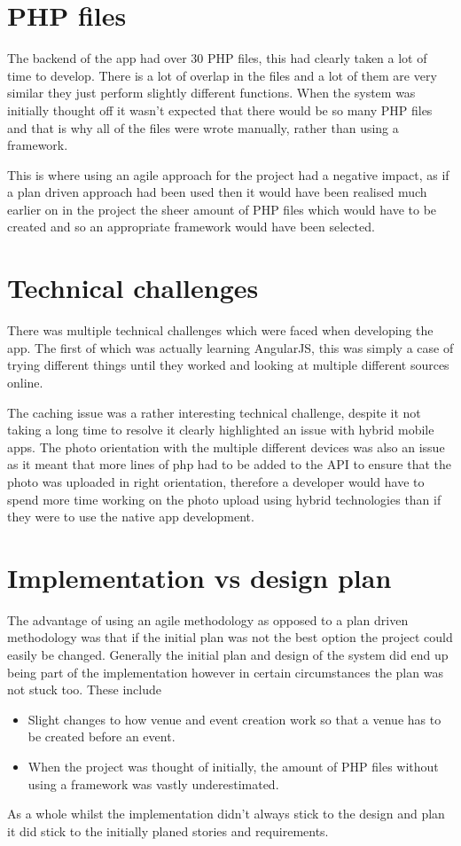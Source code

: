 \section{PHP files}
The backend of the app had over 30 PHP files, this had clearly taken a lot of time to develop. There is a lot of overlap in the files and a lot of them are very similar they just perform slightly different functions. When the system was initially thought off it wasn't expected that there would be so many PHP files and that is why all of the files were wrote manually, rather than using a framework. 

This is where using an agile approach for the project had a negative impact, as if a plan driven approach had been used then it would have been realised much earlier on in the project the sheer amount of PHP files which would have to be created and so an appropriate framework would have been selected.

\section{Technical challenges}
There was multiple technical challenges which were faced when developing the app. The first of which was actually learning AngularJS, this was simply a case of trying different things until they worked and looking at multiple different sources online.

The caching issue was a rather interesting technical challenge, despite it not taking a long time to resolve it clearly highlighted an issue with hybrid mobile apps. The photo orientation with the multiple different devices was also an issue as it meant that more lines of php had to be added to the API to ensure that the photo was uploaded in right orientation, therefore a developer would have to spend more time working on the photo upload using hybrid technologies than if they were to use the native app development.

\section{Implementation vs design plan}
The advantage of using an agile methodology as opposed to a plan driven methodology was that if the initial plan was not the best option the project could easily be changed. Generally the initial plan and design of the system did end up being part of the implementation however in certain circumstances the plan was not stuck too. These include 
\begin{itemize}
  \item Slight changes to how venue and event creation work so that a venue has to be created before an event.
  \item When the project was thought of initially, the amount of PHP files without using a framework was vastly underestimated.
\end{itemize}
As a whole whilst the implementation didn't always stick to the design and plan it did stick to the initially planed stories and requirements.
